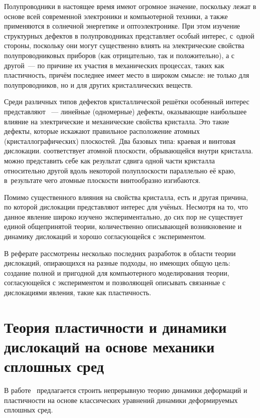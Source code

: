 \documentclass[a4paper, 14pt, titlepage]{extarticle}
\begin{document}
  \label{sec:intro}

  Полупроводники в настоящее время имеют огромное значение, поскольку лежат в основе всей
  современной электроники и компьютерной техники, а также применяются в солнечной энергетике и
  оптоэлектронике. При этом изучение структурных дефектов в полупроводниках представляет особый
  интерес, с~одной стороны, поскольку они могут существенно влиять на электрические свойства
  полупроводниковых приборов (как отрицательно, так и положительно), а с другой~--- по причине их
  участия в механических процессах, таких как пластичность, причём последнее имеет место в широком
  смысле: не только для полупроводников, но и для других кристаллических веществ.

  Среди различных типов дефектов кристаллической решётки особенный интерес представляют
  ~--- линейные (одномерные) дефекты, оказывающие наибольшее влияние на электрические и
  механические свойства кристалла. Это такие дефекты, которые искажают правильное расположение
  атомных (кристаллографических) плоскостей. Два базовых типа: краевая и винтовая дислокации.
   соответствует атомной плоскости, обрывающейся внутри кристалла.
   можно представить себе как результат сдвига одной
  части кристалла относительно другой вдоль некоторой полуплоскости параллельно её краю,
  в~результате чего атомные плоскости винтообразно изгибаются.

  Помимо существенного влияния на свойства кристалла, есть и другая причина, по которой
  дислокации представляют интерес для учёных. Несмотря на то, что данное явление широко изучено
  экспериментально, до сих пор не существует единой общепринятой теории, количественно описывающей
  возникновение и динамику дислокаций и хорошо согласующейся с экспериментом.

  В реферате рассмотрены несколько последних разработок в области теории дислокаций,
  опирающихся на разные подходы, но имеющих общую цель: создание полной и пригодной для
  компьютерного моделирования теории, согласующейся с экспериментом и позволяющей описывать
  связанные с дислокациями явления, такие как пластичность.

  \section{Теория пластичности и динамики дислокаций на основе механики сплошных сред}

  В работе~\cite{hochrainer-cdd} предлагается строить непрерывную теорию динамики деформаций и
  пластичности на основе классических уравнений динамики деформируемых сплошных сред.
\end{document}

